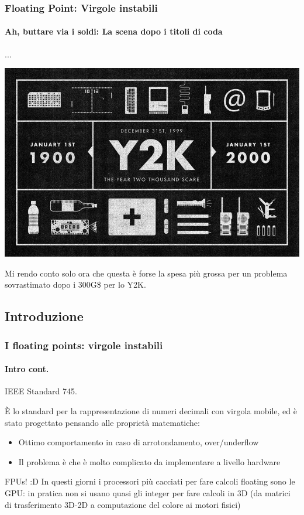 \documentclass{beamer}
\begin{document}
	  \begin{frame}
	  		\frametitle{Floating Point: Virgole instabili}
	    \framesubtitle{Ah, buttare via i soldi: La scena dopo i titoli di coda}
	  
	  		\begin{center}
	  		...
	  		\end{center}
	  		
	  		\pause
	    
			\begin{center}
	    		\includegraphics[width=.6\textwidth]{IMGs/Y2K.jpg}
	    \end{center}	    
	    
	    \begin{center}
	    		Mi rendo conto solo ora che questa è forse la spesa più grossa per un problema
	    		sovrastimato dopo i 300G\$ per lo Y2K.
			\end{center}	    
	    
	  \end{frame}
	  
  \subsection{Introduzione}
  \begin{frame}
    \frametitle{I floating points: virgole instabili}
    \framesubtitle{Intro cont.}
      IEEE Standard 745.
      
      \vspace{2em}
      
      È lo standard per la rappresentazione di numeri decimali con virgola mobile, ed è stato progettato
      pensando alle proprietà matematiche:
      
      \begin{itemize}
      		\item Ottimo comportamento in caso di arrotondamento, over/underflow
      		\item Il problema è che è molto complicato da implementare a livello hardware
      \end{itemize}
      
      \begin{block}{FPUs! :D}
      		In questi giorni i processori più cacciati per fare calcoli floating sono le GPU:
      		in pratica non si usano quasi gli integer per fare calcoli in 3D (da matrici di trasferimento
      		3D-2D a computazione del colore ai motori fisici)
      \end{block}
  \end{frame}
\end{document}
